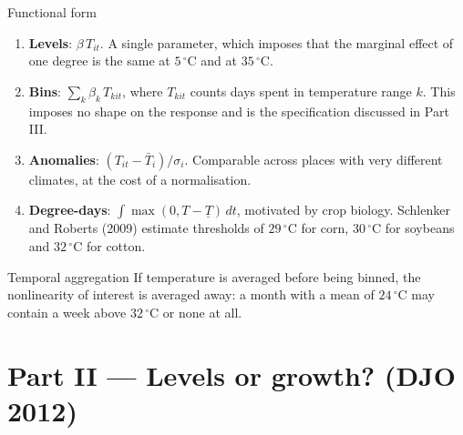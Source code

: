 \documentclass[aspectratio=169,10pt]{beamer}
\begin{document}
\begin{frame}{Functional form}
  \small
  \begin{enumerate}
    \item \textbf{Levels}: $\beta\,T_{it}$. A single parameter, which imposes that the
          marginal effect of one degree is the same at $5\,^\circ$C and at
          $35\,^\circ$C.
    \item \textbf{Bins}: $\sum_k \beta_k\, T_{kit}$, where $T_{kit}$ counts days spent
          in temperature range $k$. This imposes no shape on the response and is the
          specification discussed in Part III.
    \item \textbf{Anomalies}: $(T_{it}-\bar T_i)/\sigma_i$. Comparable across places
          with very different climates, at the cost of a normalisation.
    \item \textbf{Degree-days}: $\int \max(0, T - \underline{T})\,dt$, motivated by
          crop biology. Schlenker and Roberts (2009) estimate thresholds of
          $29\,^\circ$C for corn, $30\,^\circ$C for soybeans and $32\,^\circ$C for
          cotton.
  \end{enumerate}
  \vspace{4pt}
  \begin{block}{Temporal aggregation}
    \small If temperature is averaged before being binned, the nonlinearity of
    interest is averaged away: a month with a mean of $24\,^\circ$C may contain a week
    above $32\,^\circ$C or none at all.
  \end{block}
\end{frame}

\section{Part II — Levels or growth? (DJO 2012)}
\end{document}
